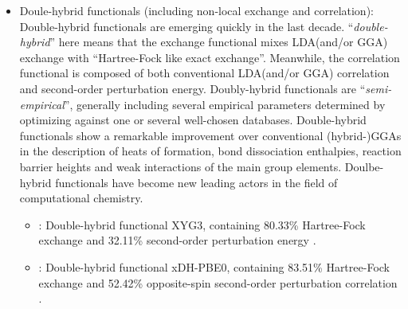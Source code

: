 \begin{itemize}
\begin{itemize}
    functionals; with 27\% exact exchange. \cite{ZhaoTruhlar06_M06_M06-2X}
  \item {} : Truhlar's optimized hybrid meta-GGA of the ``M06'' suite of
    functionals, with double contribution (54\%) from the hartree-fock exact exchange. \cite{ZhaoTruhlar06_M06_M06-2X}
  \item {} : Truhlar's optimized hybrid meta-GGA of the ``M06'' suite of
    functionals, with 100\% exact exchage contribution. \cite{ZhaoTruhlar06_M06-HF}
  \item {} : Truhlar's optimized hybrid meta-GGA of the ``M08'' suite of
    functionals, with 52.23\% contribution from the hartree-fock exact exchange. \cite{ZhaoTruhlar08_M08-HX_M08-SO}
  \item {} : Truhlar's optimized hybrid meta-GGA of the ``M08'' suite of
    functionals, with 56.79\% contribution from the hartree-fock exact exchange. \cite{ZhaoTruhlar08_M08-HX_M08-SO}
  \item {} : Truhlar's optimized range-separated local meta-GGA of the ``M11'' suite of
  functionals \cite{PeveratiTruhlar11_M11}. The range-separation variable is also hardcoded in this implementation with
  $\omega = 0.25$ bohr$^{-1}$.
    \end{itemize}
  \item Doule-hybrid functionals (including non-local exchange and correlation):
	  Double-hybrid functionals are emerging quickly in the last decade. ``\emph{double-hybrid}'' here
	  means that the exchange functional mixes LDA(and/or GGA) exchange with ``Hartree-Fock like exact exchange''.
	  Meanwhile, the correlation functional is composed of both conventional LDA(and/or GGA) correlation and
	  second-order perturbation energy. Doubly-hybrid functionals are ``\emph{semi-empirical}'', generally
	  including several empirical parameters determined by optimizing against one or several well-chosen databases.
	  Double-hybrid functionals show a remarkable improvement over conventional (hybrid-)GGAs in the description
	  of heats of formation, bond dissociation enthalpies, reaction barrier heights and weak interactions of the 
	  main group elements.
	  Doulbe-hybrid functionals have become new leading actors in the field of computational chemistry.
     \begin{itemize}
		 \item {} : Double-hybrid functional XYG3, containing 80.33\% Hartree-Fock exchange
			 and 32.11\% second-order perturbation energy \cite{Zhang2009}.
		 \item {} : Double-hybrid functional xDH-PBE0, containing 83.51\% Hartree-Fock exchange
			 and 52.42\% opposite-spin second-order perturbation correlation \cite{Zhang2012}.
     \end{itemize}
	  

\end{itemize}
